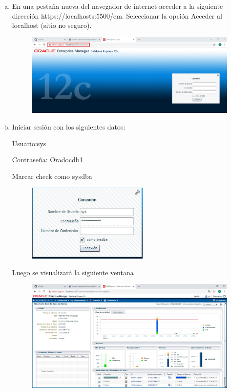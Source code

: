 \documentclass[preprint,12pt]{elsarticle}
\begin{document}
\begin{enumerate}[a)]
\item En una pestaña nueva del navegador de internet acceder a la siguiente dirección https://localhosts:5500/em. Seleccionar la opción Acceder al localhost (sitio no seguro).
\begin{figure}[htb]
	\begin{center}
		\includegraphics[width=12cm]{./IMAGENES/Docker8_13}
	\end{center}
\end{figure}

\item Iniciar sesión con los siguientes datos:
\begin{center}Usuario:sys\end{center}
\begin{center}Contraseña: Oradocdb1\end{center}
\begin{center}Marcar check como sysdba\end{center}
\begin{figure}[htb]
	\begin{center}
		\includegraphics[width=6cm]{./IMAGENES/Docker8_14}
	\end{center}
\end{figure}

Luego se visualizará la siguiente ventana
\begin{figure}[htb]
	\begin{center}
		\includegraphics[width=13cm]{./IMAGENES/Docker8_16}
	\end{center}
\end{figure}



\end{enumerate}
\end{document}

